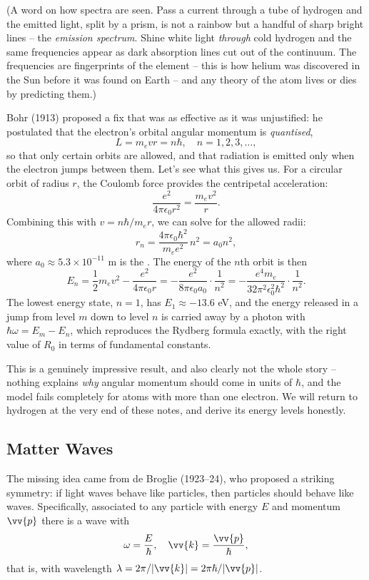 (A word on how spectra are seen. Pass a current through a tube of hydrogen and the emitted light, split by a prism, is not a rainbow but a handful of sharp bright lines -- the \emph{emission spectrum}. Shine white light \emph{through} cold hydrogen and the same frequencies appear as dark absorption lines cut out of the continuum. The frequencies are fingerprints of the element -- this is how helium was discovered in the Sun before it was found on Earth -- and any theory of the atom lives or dies by predicting them.)

Bohr (1913) proposed a fix that was as effective as it was unjustified: he postulated that the electron's orbital angular momentum is \emph{quantised},
$$
L = m_e v r = n \hbar, \quad n = 1, 2, 3, \dots,
$$
so that only certain orbits are allowed, and that radiation is emitted only when the electron jumps between them. Let's see what this gives us. For a circular orbit of radius $r$, the Coulomb force provides the centripetal acceleration:
$$
\frac{e^2}{4 \pi \epsilon_0 r^2} = \frac{m_e v^2}{r}.
$$
Combining this with $v = n \hbar / m_e r$, we can solve for the allowed radii:
$$
r_n = \frac{4 \pi \epsilon_0 \hbar^2}{m_e e^2} \, n^2 = a_0 n^2,
$$
where $a_0 \approx 5.3 \times 10^{-11}$ m is the . The energy of the $n$th orbit is then
$$
E_n = \frac{1}{2} m_e v^2 - \frac{e^2}{4 \pi \epsilon_0 r} = -\frac{e^2}{8 \pi \epsilon_0 a_0} \cdot \frac{1}{n^2} = - \frac{e^4 m_e}{32 \pi^2 \epsilon_0^2 \hbar^2} \cdot \frac{1}{n^2}.
$$
The lowest energy state, $n = 1$, has $E_1 \approx -13.6$ eV, and the energy released in a jump from level $m$ down to level $n$ is carried away by a photon with $\hbar \omega = E_m - E_n$, which reproduces the Rydberg formula exactly, with the right value of $R_0$ in terms of fundamental constants.

This is a genuinely impressive result, and also clearly not the whole story -- nothing explains \emph{why} angular momentum should come in units of $\hbar$, and the model fails completely for atoms with more than one electron. We will return to hydrogen at the very end of these notes, and derive its energy levels honestly.

\subsection{Matter Waves}

The missing idea came from de Broglie (1923--24), who proposed a striking symmetry: if light waves behave like particles, then particles should behave like waves. Specifically, associated to any particle with energy $E$ and momentum $\vv{p}$ there is a wave with
$$
\omega = \frac{E}{\hbar}, \quad \vv{k} = \frac{\vv{p}}{\hbar},
$$
that is, with wavelength $\lambda = 2 \pi / |\vv{k}| = 2 \pi \hbar / |\vv{p}|$.

